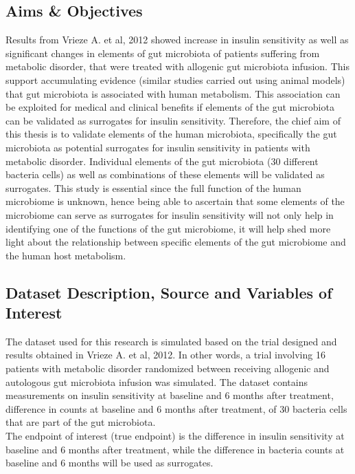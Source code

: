 \documentclass[a4paper,12pt]{article}
\begin{document}
	\subsection{Aims \& Objectives}
	Results from Vrieze A. et al, 2012\citep{Vrieze} showed increase in insulin sensitivity as well as significant changes in elements of gut microbiota of patients suffering from metabolic disorder, that were treated with allogenic gut microbiota infusion. This support accumulating evidence (similar studies carried out using animal models\citep{turnbaugh,backhed}) that gut microbiota is associated with human metabolism. This association can be exploited for medical and clinical benefits if elements of the gut microbiota can be validated as surrogates for insulin sensitivity. Therefore, the chief aim of this thesis is to validate elements of the human microbiota, specifically the gut microbiota as potential surrogates for insulin sensitivity in patients with metabolic disorder. Individual elements of the gut microbiota (30 different bacteria cells) as well as combinations of these elements will be validated as surrogates. This study is essential since the full function of the human microbiome is unknown, hence being able to ascertain that some elements of the microbiome can serve as surrogates for insulin sensitivity will not only help in identifying one of the functions of the gut microbiome, it will help shed more light about the relationship between specific elements of the gut microbiome and the human host metabolism.
	
	\subsection{Dataset Description, Source and Variables of Interest}
	The dataset used for this research is simulated based on the trial designed and results obtained in Vrieze A. et al, 2012\citep{Vrieze}. In other words, a trial involving 16 patients with metabolic disorder randomized between receiving allogenic and autologous gut microbiota infusion was simulated. The dataset contains measurements on insulin sensitivity at baseline and 6 months after treatment, difference in counts at baseline and 6 months after treatment, of 30 bacteria cells that are part of the gut microbiota.\\ 
	
	The endpoint of interest (true endpoint) is the difference in insulin sensitivity at baseline and 6 months after treatment, while the difference in bacteria counts at baseline and 6 months will be used as surrogates.
	
\end{document}
